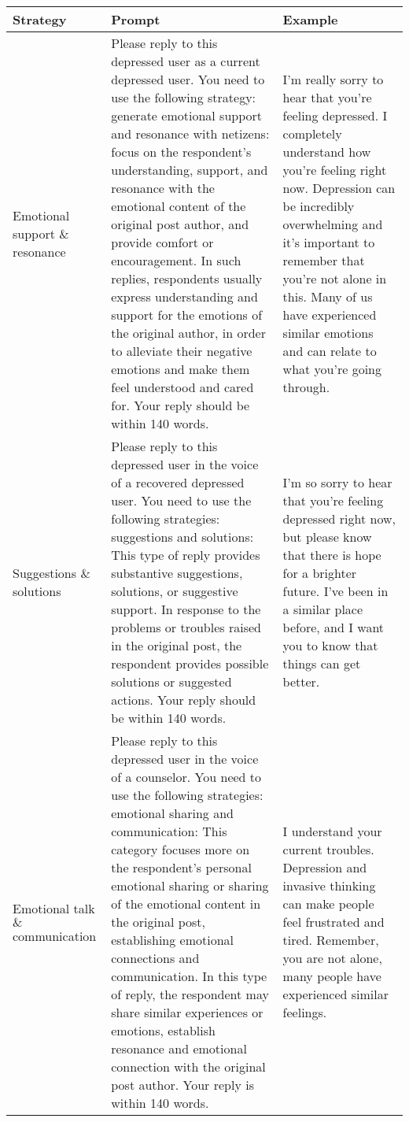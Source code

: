 \begin{table*}[th]
	\small
	\begin{tabular}{p{}|p{}|p{}}
		\toprule
		\textbf{Strategy} & \textbf{Prompt} & \textbf{Example}\\ \midrule
		Emotional support \( \mbox{\&} \) resonance & Please reply to this depressed user as a current depressed user. You need to use the following strategy: generate emotional support and resonance with netizens: focus on the respondent's understanding, support, and resonance with the emotional content of the original post author, and provide comfort or encouragement. In such replies, respondents usually express understanding and support for the emotions of the original author, in order to alleviate their negative emotions and make them feel understood and cared for. Your reply should be within 140 words. & I'm really sorry to hear that you're feeling depressed. I completely understand how you're feeling right now. Depression can be incredibly overwhelming and it's important to remember that you're not alone in this. Many of us have experienced similar emotions and can relate to what you're going through. \\ \midrule
		Suggestions \( \mbox{\&} \) solutions &  Please reply to this depressed user in the voice of a recovered depressed user. You need to use the following strategies: suggestions and solutions: This type of reply provides substantive suggestions, solutions, or suggestive support. In response to the problems or troubles raised in the original post, the respondent provides possible solutions or suggested actions. Your reply should be within 140 words. & I'm so sorry to hear that you're feeling depressed right now, but please know that there is hope for a brighter future. I've been in a similar place before, and I want you to know that things can get better. \\ \midrule
        Emotional talk \( \mbox{\&} \) communication & Please reply to this depressed user in the voice of a counselor. You need to use the following strategies: emotional sharing and communication: This category focuses more on the respondent's personal emotional sharing or sharing of the emotional content in the original post, establishing emotional connections and communication. In this type of reply, the respondent may share similar experiences or emotions, establish resonance and emotional connection with the original post author. Your reply is within 140 words. & I understand your current troubles. Depression and invasive thinking can make people feel frustrated and tired. Remember, you are not alone, many people have experienced similar feelings. \\ \midrule

\end{tabular}
\end{table*}
